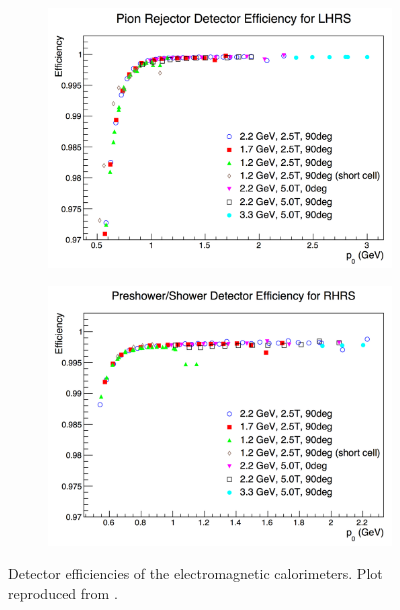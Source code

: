 \begin{figure}[tb!]
  \centering
  \begin{subfigure}[t]{0.49\textwidth}
    \includegraphics[width=\textwidth]{figs/calorimeters-efficiency-left.png}
  \end{subfigure}
  \begin{subfigure}[t]{0.49\textwidth}
    \includegraphics[width=\textwidth]{figs/calorimeters-efficiency-right.png}
  \end{subfigure}
  \caption[Detector efficiencies of the electromagnetic calorimeters.]{Detector efficiencies of the electromagnetic calorimeters. Plot reproduced from \cite{Cummings2013}. \label{C7S2SS2F2}}
\end{figure}

